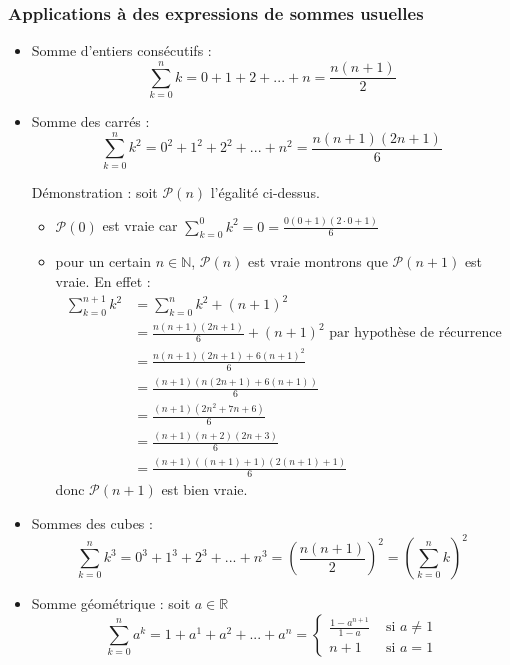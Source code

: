 \documentclass[12pt,a4paper,french]{book}
\begin{document}
\subsubsection{Applications à des expressions de sommes usuelles}
\begin{itemize}
	\item Somme d'entiers consécutifs :
	\[ \sum_{k=0}^{n} k = 0 + 1 + 2 + ... + n = \frac{n(n+1)}{2}\]
	\item Somme des carrés :
	\[ \sum_{k=0}^{n} k^{2} = 0^{2} + 1^{2} + 2^{2} + ... + n^{2} = \frac{n(n+1)(2n+1)}{6}\]
	
	Démonstration : soit $\mathcal{P}(n)$ l'égalité ci-dessus. 
	\begin{itemize}
		\item $\mathcal{P}(0)$ est vraie car $\sum_{k=0}^{0} k^{2} = 0 = \frac{0(0+1)(2\cdot0+1)}{6}$
		\item {} pour un certain $n \in \mathbb{N}$, $\mathcal{P}(n)$ est vraie  montrons que $\mathcal{P}(n+1)$ est vraie. En effet :
		\begin{equation} 
			\begin{split}
				\sum_{k=0}^{n+1} k^{2} &= \sum_{k=0}^{n} k^{2} + (n+1)^{2} \\ &= \frac{n(n+1)(2n+1)}{6} + (n+1)^{2} \mbox{  par hypothèse de récurrence} \\ &= \frac{n(n+1)(2n+1)+6(n+1)^{2}}{6} \\ &= \frac{(n+1)(n(2n+1)+6(n+1))}{6} \\ &= \frac{(n+1)(2n^{2}+7n+6)}{6} \\ &= \frac{(n+1)(n+2)(2n+3)}{6} \\&= \frac{(n+1)((n+1)+1)(2(n+1)+1)}{6}
			\end{split}
		\end{equation}
		donc $\mathcal{P}(n+1)$ est bien vraie.
	\end{itemize}
	\item Sommes des cubes : 
	\[ \sum_{k=0}^{n} k^{3} = 0^{3} + 1^{3} + 2^{3} + ... + n^{3} = \left( \frac{n(n+1)}{2}\right)^{2} = \left( \sum_{k=0}^{n} k\right)^{2} \]
	\item Somme géométrique : soit $a \in \mathbb{R}$
	\[ \sum_{k=0}^{n} a^{k} = 1 + a^{1} + a^{2} + ... + a^{n} = \left\{ 
	\begin{array}{ll}
		\frac{1-a^{n+1}}{1-a} &\mbox{ si } a \neq 1 \\ 
		n+1 &\mbox{ si } a=1
	\end{array}
	\right.
	\]
\end{itemize}
\end{document}
